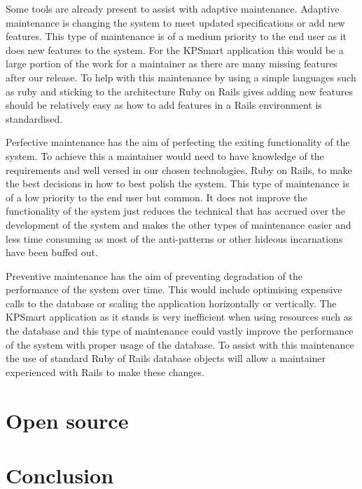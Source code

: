 \documentclass{style/CRPITStyle}
\renewcommand{\cite}{\citep}
\begin{document}
\vspace{.1in}

Some tools are already present to assist with adaptive maintenance. Adaptive
maintenance is changing the system to meet updated specifications or add new
features. This type of maintenance is of a medium priority to the end user as it
does new features to the system.
For the KPSmart application this would be a large portion of the work
for a maintainer as there are many missing features after our release. To help
with this maintenance by using a simple languages such as ruby and sticking to
the architecture Ruby on Rails gives adding new features should be relatively
easy as how to add features in a Rails environment is standardised. 

\vspace{.1in}

Perfective maintenance has the aim of perfecting the exiting functionality of
the system. To achieve this a maintainer would need to have knowledge of the
requirements and well versed in our chosen technologies, Ruby on Rails, to make
the best decisions in how to best polish the system. This type of maintenance is
of a low priority to the end user but common. It does not improve the functionality
of the system just reduces the technical that has accrued over the development
of the system and makes the other types of maintenance easier and less time
consuming as most of the anti-patterns or other hideous incarnations have been
buffed out.

\vspace{.1in}

Preventive maintenance has the aim of preventing degradation of the performance
of the system over time. This would include optimising expensive calls to the
database or scaling the application horizontally or vertically. The KPSmart
application as it stands is very inefficient when using resources such as the database
and this type of maintenance could vastly improve the performance of the system
with proper usage of the database. To assist with this maintenance the
use of standard Ruby of Rails database objects will allow a maintainer
experienced with Rails to make these changes.

\section{Open source}
% 
\cite{raymond:1999:cathedral}
\cite{raymond:1999:magic}

\section{Conclusion}



\end{document}
